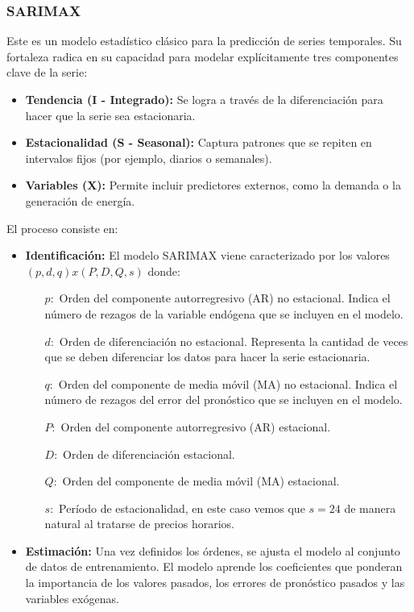 \subsubsection{SARIMAX}
%
%
%
Este es un modelo estadístico clásico para la predicción de series temporales. Su fortaleza radica en su capacidad para modelar explícitamente tres componentes clave de la serie:

\begin{itemize}
    \item \textbf{Tendencia (I - Integrado):} Se logra a través de la diferenciación para hacer que la serie sea estacionaria.
    \item \textbf{Estacionalidad (S - Seasonal):} Captura patrones que se repiten en intervalos fijos (por ejemplo, diarios o semanales).
    \item \textbf{Variables (X):} Permite incluir predictores externos, como la demanda o la generación de energía.
\end{itemize}

El proceso consiste en:
\begin{itemize}
    \item \textbf{Identificación:} El modelo SARIMAX viene caracterizado por los valores $(p,d,q)x(P,D,Q,s)$ donde:
        \begin{itemize}
        \item[$p:$] Orden del componente autorregresivo (AR) no estacional. Indica el número de rezagos de la variable endógena que se incluyen en el modelo.
        \item[$d:$] Orden de diferenciación no estacional. Representa la cantidad de veces que se deben diferenciar los datos para hacer la serie estacionaria.
        \item[$q:$] Orden del componente de media móvil (MA) no estacional. Indica el número de rezagos del error del pronóstico que se incluyen en el modelo.
        \item[$P:$] Orden del componente autorregresivo (AR) estacional.
        \item[$D:$] Orden de diferenciación estacional.
        \item[$Q:$] Orden del componente de media móvil (MA) estacional.
        \item[$s:$] Período de estacionalidad, en este caso vemos que $s=24$ de manera natural al tratarse de precios horarios.
    \end{itemize}
    
    \item \textbf{Estimación:} Una vez definidos los órdenes, se ajusta el modelo al conjunto de datos de entrenamiento. El modelo aprende los coeficientes que ponderan la importancia de los valores pasados, los errores de pronóstico pasados y las variables exógenas.
\end{itemize}

